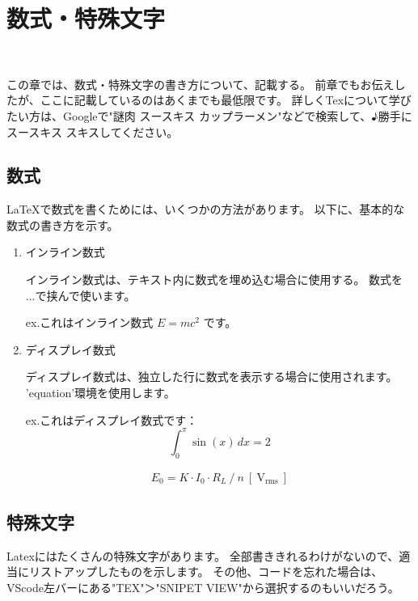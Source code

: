 \chapter{数式・特殊文字}
\vspace{20mm}\hrulefill\\\vspace{20mm}

この章では、数式・特殊文字の書き方について、記載する。
前章でもお伝えしたが、ここに記載しているのはあくまでも最低限です。
詳しくTexについて学びたい方は、Googleで"謎肉 スースキス カップラーメン"などで検索して、♪勝手に スースキス スキスしてください。

\newpage

\section{数式}
LaTeXで数式を書くためには、いくつかの方法があります。
以下に、基本的な数式の書き方を示す。
\begin{enumerate}
	\item インライン数式
	
		インライン数式は、テキスト内に数式を埋め込む場合に使用する。
		数式を $ ... $で挟んで使います。
		
		ex.これはインライン数式 $E=mc^2$ です。

	\item ディスプレイ数式
	
		ディスプレイ数式は、独立した行に数式を表示する場合に使用されます。
		'equation'環境を使用します。
		
		ex.これはディスプレイ数式です：
		\begin{equation}
			\int_{0}^{\pi} \sin(x) \, dx = 2
		\end{equation}

		\begin{eqnarray}
			E_0 = {K}\cdot{I_0}\cdot{R_L}\ /\ {n}\  [\ \mathrm{V_{rms}}\ ]
		\end{eqnarray}

\end{enumerate}

\section{特殊文字}
Latexにはたくさんの特殊文字があります。
全部書ききれるわけがないので、適当にリストアップしたものを示します。
その他、コードを忘れた場合は、VScode左バーにある"TEX"＞"SNIPET VIEW"から選択するのもいいだろう。

